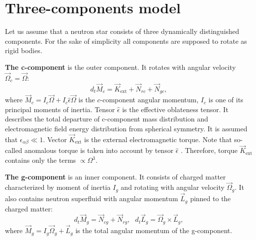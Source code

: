 \documentclass[a4paper]{jpconf}
\begin{document}
  \section{Three-components model}
    Let us assume that a neutron star consists of three dynamically distinguished components. For the sake of simplicity all components are supposed to rotate as rigid bodies.    

    \textbf{The c-component} is the outer component.
    It rotates with angular velocity $\vec{\Omega}_c = \vec{\Omega}$:
    \begin{equation}
      \label{eq:dt_Mc}
      d_t\vec{M}_{c} =  \vec{K}_\mathrm{ext} + \vec{N}_{rc} + \vec{N}_{gc},
    \end{equation}
    where $\vec{M}_{c} = I_{c} \vec{\Omega} + I_{c} \hat{\epsilon} \vec{\Omega}$ is the $c$-component angular momentum, $I_{c}$ is one of its principal moments of inertia.  Tensor $\hat{\epsilon}$ is the effective oblateness tensor. 
    It describes the total departure of c-component mass distribution and electromagnetic field energy distribution from spherical symmetry.
    It is assumed that $\epsilon_{\alpha\beta} \ll 1$.
    Vector $\vec{K}_\mathrm{ext}$ is the external electromagnetic torque. Note that so-called anomalous torque is taken into account by tensor $\hat{\epsilon}$ \cite{GBT2015}.
    Therefore, torque $\vec{K}_\mathrm{ext}$ contains only the terms $\propto \Omega^3$.
    
    \textbf{The g-component} is an inner component. It consists of charged matter characterized by moment of inertia $I_g$ and rotating with angular velocity $\vec{\Omega}_g$. It also contains neutron superfluid with angular momentum $\vec{L}_g$ pinned to the charged matter:  
    \begin{equation}
      \label{eq:dt_Mg}
      d_t{\vec{M}}_{g}  = \vec{N}_{cg} + \vec{N}_{rg}, \ \ \ d_t \vec{L}_g = \vec{\Omega}_g\times\vec{L}_g,
    \end{equation}
    where $\vec{M}_{g} = I_g\vec{\Omega}_g + \vec{L}_g$ is the total angular momentum of the g-component.
    
\end{document}
